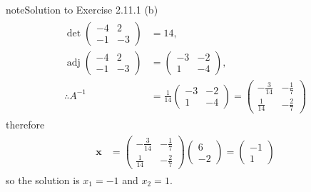 \documentclass[letterpaper,10pt,english]{jupyterBook}
\begin{document}
\begin{sphinxadmonition}{note}{Solution to Exercise 2.11.1}
\sphinxAtStartPar
(b)
\begin{equation*}
\begin{split} \begin{align*}
    \det\left(\begin{matrix}-4 & 2\\-1 & -3\end{matrix}\right) &= 14, \\ 
    \operatorname{adj}\left(\begin{matrix}-4 & 2\\-1 & -3\end{matrix}\right) &= \left(\begin{matrix}-3 & -2\\1 & -4\end{matrix}\right), \\ 
    \therefore A^{-1} &= \frac{1}{14}\left(\begin{matrix}-3 & -2\\1 & -4\end{matrix}\right) = \left(\begin{matrix}- \frac{3}{14} & - \frac{1}{7}\\\frac{1}{14} & - \frac{2}{7}\end{matrix}\right) 
\end{align*} \end{split}
\end{equation*}
\sphinxAtStartPar
therefore
\begin{equation*}
\begin{split}\begin{align*}
    \mathbf{x} &= \left(\begin{matrix}- \frac{3}{14} & - \frac{1}{7}\\\frac{1}{14} & - \frac{2}{7}\end{matrix}\right)
    \left(\begin{matrix}6\\-2\end{matrix}\right) = 
    \left(\begin{matrix}-1\\1\end{matrix}\right)
\end{align*} \end{split}
\end{equation*}
\sphinxAtStartPar
so the solution is \(x_1 = -1\) and \(x_2 = 1\).


\end{sphinxadmonition}
\end{document}
